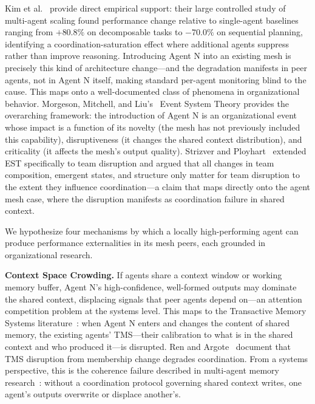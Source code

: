Kim et al.~\cite{kim2025scaling} provide direct empirical support: their large
controlled study of multi-agent scaling found performance change relative to
single-agent baselines ranging from $+80.8\%$ on decomposable tasks to
$-70.0\%$ on sequential planning, identifying a coordination-saturation effect
where additional agents suppress rather than improve reasoning. Introducing
Agent N into an existing mesh is precisely this kind of architecture
change---and the degradation manifests in peer agents, not in Agent N itself,
making standard per-agent monitoring blind to the cause. This maps onto a
well-documented class of phenomena in organizational behavior. Morgeson,
Mitchell, and Liu's~\cite{morgeson2015event} Event System Theory provides the
overarching framework: the introduction of Agent N is an organizational event
whose impact is a function of its novelty (the mesh has not previously included
this capability), disruptiveness (it changes the shared context distribution),
and criticality (it affects the mesh's output quality). Strizver and
Ployhart~\cite{strizver2024disruption} extended EST specifically to team
disruption and argued that all changes in team composition, emergent states,
and structure only matter for team disruption to the extent they influence
coordination---a claim that maps directly onto the agent mesh case, where the
disruption manifests as coordination failure in shared context.

We hypothesize four mechanisms by which a locally high-performing agent can
produce performance externalities in its mesh peers, each grounded in
organizational research.

\textbf{Context Space Crowding.} If agents share a context window or working
memory buffer, Agent N's high-confidence, well-formed outputs may dominate the
shared context, displacing signals that peer agents depend on---an attention
competition problem at the systems level. This maps to the Transactive Memory
Systems literature~\cite{wegner1987transactive,lewis2007group,ren2011transactive}:
when Agent N enters and changes the content of shared memory, the existing
agents' TMS---their calibration to what is in the shared context and who
produced it---is disrupted. Ren and Argote~\cite{ren2011transactive} document
that TMS disruption from membership change degrades coordination. From a systems
perspective, this is the coherence failure described in multi-agent memory
research~\cite{fu2026memory}: without a coordination protocol governing shared
context writes, one agent's outputs overwrite or displace another's.

